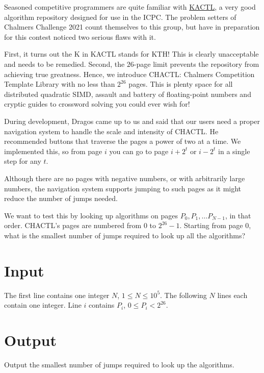 Seasoned competitive programmers are quite familiar with \href{https://github.com/kth-competitive-programming/kactl}{\textsc{KACTL}}, a very good algorithm repository designed for use in the ICPC.
The problem setters of Chalmers Challenge 2021 count themselves to
this group, but have in preparation for this contest noticed two serious flaws with it.

First, it turns out the \textsc{K} in \textsc{KACTL} stands for \textsc{KTH}! This is clearly
unacceptable and needs to be remedied. Second, the $26$-page limit prevents the repository from
achieving true greatness. Hence, we introduce \textsc{CHACTL}: Chalmers Competition Template Library
with no less than $2^{26}$ pages. This is plenty space for all distributed quadratic SIMD, assault and
battery of floating-point numbers and cryptic guides to crossword solving you could ever wish for!

During development, Dragos came up to us and said that our users need a proper navigation system to
handle the scale and intensity of \textsc{CHACTL}. He recommended buttons that traverse the pages a
power of two at a time. We implemented this, so from page $i$ you can go to page $i + 2^t$ or $i -
2^t$ in a single step for any $t$.

Although there are no pages with negative numbers, or with arbitrarily large numbers, the navigation
system supports jumping to such pages as it might reduce the number of jumps needed.

We want to test this by looking up algorithms on pages $P_0, P_1, \ldots P_{N-1}$, in that order.
\textsc{CHACTL}'s pages are numbered from $0$ to $2^{26} - 1$. Starting from page $0$, what is the
smallest number of jumps required to look up all the algorithms?

\section*{Input}
The first line contains one integer $N$, $1 \le N \le 10^5$. The following $N$ lines each contain
one integer. Line $i$ contains $P_i$, $0 \le P_i < 2^{26}$.

\section*{Output}
Output the smallest number of jumps required to look up the algorithms.
